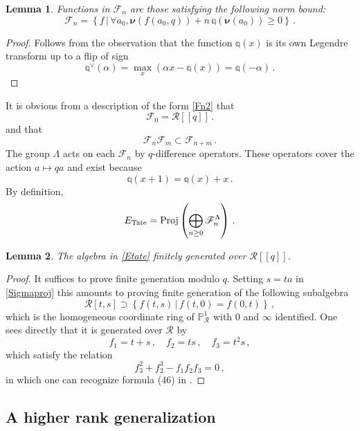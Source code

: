 \documentclass[14pt]{extarticle}
\newcommand{\bP}{\mathbb{P}}
\newcommand{\cR}{\mathscr{R}}
\newcommand{\cF}{\mathscr{F}}
\newcommand{\Qq}{\mathbb{q}}
\newcommand{\bnu}{\boldsymbol \nu}
\DeclareMathOperator{\Proj}{Proj}
\newtheorem{Lemma}{Lemma}[section]
\theoremstyle{definition}
\begin{document}
\begin{Lemma}
  Functions in $\cF_n$ are those satisfying the
  following norm bound: 
\begin{equation}
\cF_n = \left\{f \, \Big| \, \forall a_0,
  \bnu(f(a_0,q))+n \, \Qq \left(\bnu (a_0)\right) \ge 0\right\}
\,.\label{Fn2}
\end{equation}
%
\end{Lemma}
\begin{proof}
  Follows from the observation that
  the function $\Qq(x)$ is its own Legendre transform up to a
flip of sign
%
\begin{equation}
\Qq^\vee(\alpha) = \max_{x}  \left( \alpha x - \Qq(x) \right) =
\Qq(-\alpha) \,.\label{QqLeg}
\end{equation}
%
\end{proof}

\noindent 
{}It is obvious from a description of the form \eqref{Fn2} that 
$$
\cF_0 = \cR[[q]] \,.
$$
and that 
$$
\cF_n \cF_m \subset \cF_{n+m} \,. 
$$
The group $\Lambda$ acts on each $\cF_n$ by $q$-difference
operators. These operators cover the action $a\mapsto q a$ and exist because
%
\begin{equation}
\Qq(x+1)=\Qq(x) + x \,.\label{Qqdiff}
\end{equation}
%
By definition, 
%
\begin{equation}
E_\textup{Tate} = \Proj \left(\bigoplus_{n \ge 0} \cF_n^\Lambda
  \right)
  \,.\label{Etate} 
\end{equation}
%
\begin{Lemma}
The algebra in \eqref{Etate} finitely generated over $\cR[[q]]$. 
\end{Lemma}

\begin{proof}
  It suffices to prove finite generation modulo $q$. Setting $s=ta$ in
  \eqref{Sigmaproj} this amounts to proving finite generation of
  the following subalgebra
  $$
  \cR[t,s] \supset \left\{ f(t,s) \, \big|\, f(t,0)=f(0,t) \right\}\,, 
  $$
  which is the homogeneous coordinate ring of $\bP^1_\cR$ with $0$ and
  $\infty$ identified. One sees directly that it is generated over $\cR$ by
  $$
    f_1 = t+s\,, \quad 
    f_2 = ts \,, \quad
    f_3 = t^2s \,, 
    $$
    which satisfy the relation
    $$
    f_3^2 + f_2^3 - f_1 f_2 f_3 = 0\,, 
    $$
  in which one can recognize formula (46) in \cite{Tate}. 
\end{proof}

\subsection{A higher rank generalization}\label{s_cQ} 
\end{document}
